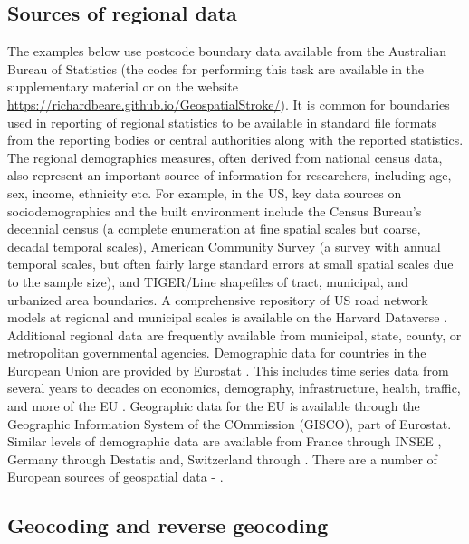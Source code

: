 \documentclass[utf8]{frontiersHLTH}
\begin{document}
\subsection{Sources of regional data}\label{sources-of-regional-data} 

The examples below use postcode boundary data available from the
Australian Bureau of Statistics (the codes for performing this task
are available in the supplementary material or on the website
\href{https://richardbeare.github.io/GeospatialStroke/}{https://richardbeare.github.io/GeospatialStroke/}). It
is common for boundaries used in reporting of regional statistics to
be available in standard file formats from the reporting bodies or
central authorities along with the reported statistics. The regional
demographics measures, often derived from national census data, also
represent an important source of information for researchers,
including age, sex, income, ethnicity etc. For example, in the US, key
data sources on sociodemographics and the built environment include
the Census Bureau's decennial census \cite{us_census_bureau_decennial}
(a complete enumeration at fine spatial scales but coarse, decadal
temporal scales), American Community Survey\cite{us_census_bureau_acs}
(a survey with annual temporal scales, but often fairly large standard
errors at small spatial scales due to the sample size), and TIGER/Line
shapefiles\cite{us_census_tiger_line} of tract, municipal, and
urbanized area boundaries. A comprehensive repository of US road
network models at regional and municipal scales is available on the
Harvard Dataverse \cite{boeing_street_2019}. Additional regional data
are frequently available from municipal, state, county, or
metropolitan governmental agencies. Demographic data for countries in
the European Union are provided by Eurostat \cite{eurostat}. This
includes time series data from several years to decades on economics,
demography, infrastructure, health, traffic, and more of the EU
\cite{Lahti2017}. Geographic data for the EU is available through the
Geographic Information System of the COmmission (GISCO), part of
Eurostat. Similar levels of demographic data are available from France
through INSEE \cite{insee}, Germany through Destatis \cite{destatis}
and, Switzerland through \cite{swiss-bfs}. There are a number of
European sources of geospatial data -
\cite{diva-gis,germany-gis,swiss-3d}.

\subsection{Geocoding and reverse geocoding}\label{geocoding-and-reverse-geocoding} 
\end{document}
